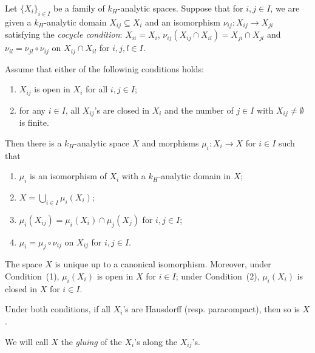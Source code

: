 \begin{proposition}\label{prop-gluing}
    Let $\{X_i\}_{i\in I}$ be a family of $k_H$-analytic spaces. Suppose that for $i,j\in I$, we are given a $k_H$-analytic domain $X_{ij}\subseteq X_i$ and an  isomorphism $\nu_{ij}:X_{ij}\rightarrow X_{ji}$ satisfying the \emph{cocycle condition}: $X_{ii}=X_i$, $\nu_{ij}(X_{ij}\cap X_{il})=X_{ji}\cap X_{jl}$ and $\nu_{il}=\nu_{jl}\circ\nu_{ij}$ on $X_{ij}\cap X_{il}$ for $i,j,l\in I$. 

    Assume that either of the followinig conditions holds:
    \begin{enumerate}
        \item $X_{ij}$ is open in $X_i$ for all $i,j\in I$;
        \item for any $i\in I$, all $X_{ij}$'s are closed in $X_i$ and the number of $j\in I$ with $X_{ij}\neq\emptyset$ is finite.  
    \end{enumerate}
    Then there is a $k_H$-analytic space $X$ and morphisms $\mu_i:X_i\rightarrow X$ for $i\in I$ such that 
    \begin{enumerate}
        \item $\mu_i$ is an isomorphism of $X_i$ with a $k_H$-analytic domain in $X$;
        \item $X=\bigcup_{i\in I}\mu_i(X_i)$;
        \item $\mu_i(X_{ij})=\mu_i(X_i)\cap \mu_j(X_j)$ for $i,j\in I$;
        \item $\mu_i=\mu_j\circ \nu_{ij}$ on $X_{ij}$ for $i,j\in I$.
    \end{enumerate}
    The space $X$ is unique up to a canonical isomorphism. Moreover, under Condition~(1), $\mu_i(X_{i})$ is open in $X$ for $i\in I$; under Condition~(2), $\mu_i(X_i)$ is closed in $X$ for $i\in I$.
    
    Under both conditions, if all $X_i$'s are Hausdorff (resp. paracompact), then so is $X$.
\end{proposition}
We will call $X$ the \emph{gluing} of the $X_i$'s along the $X_{ij}$'s.
